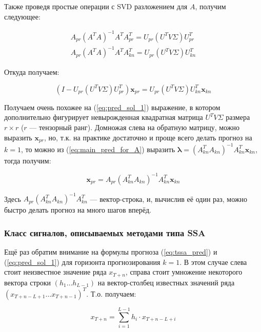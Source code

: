 			 Также проведя простые операции с SVD разложением для $ A $, получим следующее:
			 
			 \begin{gather*}
			 	A_{pr} (A^T A)^{-1} A^T A_{pr}^T = U_{pr} (U^T V \Sigma) U_{pr}^T \\
			 	A_{pr} (A^T A)^{-1} A^T A_{kn}^T = U_{pr} (U^T V \Sigma) U_{kn}^T
			 \end{gather*}
			 
			 Откуда получаем:
			 
			 \begin{equation}
			 	(I - U_{pr} (U^T V \Sigma) U_{pr}^T) \mathbf{x}_{pr} = U_{pr} (U^T V \Sigma) U_{kn}^T \mathbf{x}_{kn}
			 \end{equation}
			 
			 Получаем очень похожее на (\ref{eq:pred_sol_1}) выражение, в котором дополнительно фигурирует невырожденная квадратная матрица $ U^T V \Sigma $ размера $  r \times r$ ($ r $ --- тензорный ранг). Домножая слева на обратную матрицу, можно выразить $ \mathbf{x}_{pr} $, но, т.к. на практике достаточно и проще всего делать прогноз на $ k = 1 $, то можно из (\ref{eq:main_pred_for_A}) выразить $ \boldsymbol{\lambda} = (A_{kn}^T A_{kn})^{-1} A_{kn}^T \mathbf{x}_{kn} $, тогда получим:
			 
			 \begin{equation}\label{eq:tssa_pred}
			 	\mathbf{x}_{pr} = A_{pr} (A_{kn}^T A_{kn})^{-1} A_{kn}^T \mathbf{x}_{kn}
			 \end{equation}
			 
			 Здесь $ A_{pr} (A_{kn}^T A_{kn})^{-1} A_{kn}^T $ --- вектор-строка, и, вычислив её один раз, можно быстро делать прогноз на много шагов вперёд.
			 
			 \subsubsection*{Класс сигналов, описываемых методами типа SSA}
			 
			 Ещё раз обратим внимание на формулы прогноза (\ref{eq:tssa_pred}) и (\ref{eq:pred_sol_1}) для горизонта прогнозирования $ k = 1 $. В этом случае слева стоит неизвестное значение ряда $ x_{T + n} $, справа стоит умножение некоторого вектора строки $ (h_1 \ldots h_{L - 1}) $ на вектор-столбец известных значений ряда $ (x_{T + n - L + 1} \ldots x_{T + n - 1})^T $. Т.о. получаем:
			 
			 \begin{equation}\label{eq:autoregr}
			 	x_{T + n} = \sum\limits_{i = 1}^{L - 1} h_i \cdot x_{T + n - L + i}
			 \end{equation}
			 
